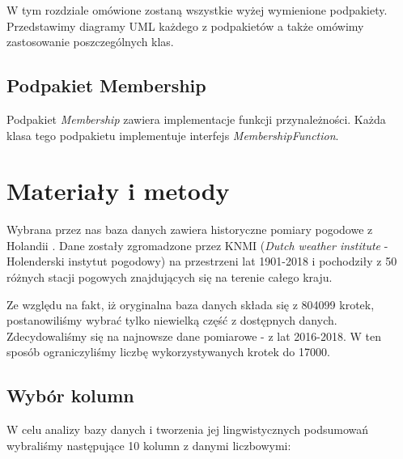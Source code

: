 \documentclass{classrep}
\begin{document}
W tym rozdziale omówione zostaną wszystkie wyżej wymienione podpakiety. Przedstawimy diagramy UML każdego z podpakietów a także omówimy zastosowanie poszczególnych klas.

\subsection{Podpakiet Membership}
Podpakiet \textit{Membership} zawiera implementacje funkcji przynależności. Każda klasa tego podpakietu implementuje interfejs  \textit{MembershipFunction}.









\section{Materiały i metody}
Wybrana przez nas baza danych zawiera historyczne pomiary pogodowe z Holandii \cite{baza}. Dane zostały zgromadzone przez KNMI (\textit{Dutch weather institute} - Holenderski instytut pogodowy) na przestrzeni lat 1901-2018 i pochodziły z 50 różnych stacji pogowych znajdujących się na terenie całego kraju.\newline

Ze względu na fakt, iż oryginalna baza danych składa się z 804099 krotek, postanowiliśmy wybrać tylko niewielką część z dostępnych danych. Zdecydowaliśmy się na najnowsze dane pomiarowe - z lat 2016-2018. W ten sposób ograniczyliśmy liczbę wykorzystywanych krotek do 17000.\newline

\subsection{Wybór kolumn}
W celu analizy bazy danych i tworzenia jej lingwistycznych podsumowań wybraliśmy następujące 10 kolumn z danymi liczbowymi:
\end{document}
